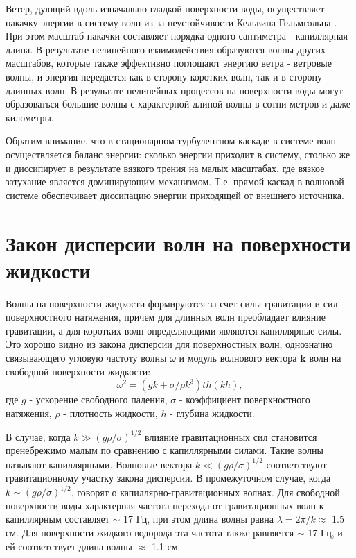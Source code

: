 Ветер, дующий вдоль изначально гладкой поверхности   воды, осуществляет накачку энергии в систему волн из-за неустойчивости Кельвина-Гельмгольца \cite[c. 99]{NonLinearWaves}. При этом масштаб накачки составляет порядка одного сантиметра - капиллярная длина. В результате нелинейного взаимодействия образуются волны других масштабов, которые также эффективно поглощают энергию ветра - ветровые волны, и энергия передается как в сторону коротких волн, так и в сторону длинных волн. В результате нелинейных процессов на поверхности воды могут образоваться большие волны с характерной длиной волны в сотни метров и даже километры. 

Обратим внимание, что в стационарном турбулентном каскаде в системе волн осуществляется баланс энергии: сколько энергии приходит в систему, столько же и диссипирует в результате вязкого трения на малых масштабах, где вязкое затухание является доминирующим механизмом. Т.е. прямой каскад в волновой системе обеспечивает диссипацию энергии приходящей от внешнего источника. 


\section{Закон дисперсии волн на поверхности жидкости}%

Волны на поверхности жидкости формируются за счет силы гравитации и сил поверхностного натяжения, причем для длинных волн преобладает влияние гравитации, а для коротких волн определяющими являются капиллярные силы. Это хорошо видно из закона дисперсии для поверхностных волн, однозначно связывающего угловую частоту волны $\omega$ и модуль волнового вектора $\mathbf{k}$ волн на свободной поверхности жидкости:
\begin{equation}
 \label{eq:disper_dip}
\omega^2 = (gk + \sigma/\rho k^3)th(kh),
\end{equation}
где $g$ - ускорение свободного падения, $\sigma$ - коэффициент поверхностного натяжения, $\rho$ - плотность жидкости, $h$ - глубина жидкости.

В случае, когда $k \gg (g\rho/\sigma)^{1/2}$ влияние гравитационных сил становится пренебрежимо малым по сравнению с капиллярными силами. Такие волны называют капиллярными. Волновые вектора $k \ll (g\rho/\sigma)^{1/2}$ соответствуют гравитационному участку закона дисперсии. В промежуточном случае, когда $k \sim (g\rho/\sigma)^{1/2}$, говорят о капиллярно-гравитационных волнах. Для свободной поверхности воды характерная частота перехода от гравитационных волн к капиллярным составляет $\sim$ 17 Гц, при этом длина волны равна $\lambda = 2\pi/k \approx$ 1.5 см. Для поверхности жидкого водорода эта частота также равняется $\sim$ 17 Гц, и ей соответствует длина волны $\approx$ 1.1 см.



